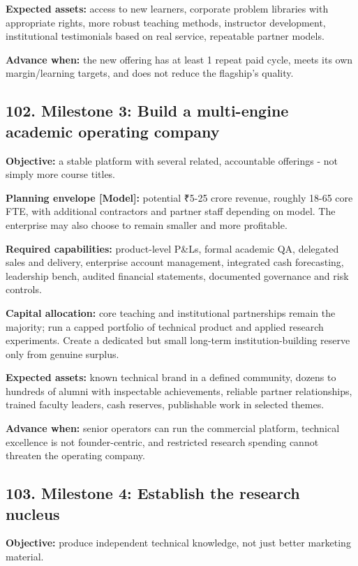 \textbf{Expected assets:} access to new learners, corporate problem libraries with appropriate rights, more robust teaching methods, instructor development, institutional testimonials based on real service, repeatable partner models.

\textbf{Advance when:} the new offering has at least 1 repeat paid cycle, meets its own margin/\allowbreak learning targets, and does not reduce the flagship's quality.

\subsection{102. Milestone 3: Build a multi-engine academic operating company}

\textbf{Objective:} a stable platform with several related, accountable offerings - not simply more course titles.

\textbf{Planning envelope \textbf{[Model]}:} potential \textnormal{₹}5-25 crore revenue, roughly 18-65 core FTE, with additional contractors and partner staff depending on model. The enterprise may also choose to remain smaller and more profitable.

\textbf{Required capabilities:} product-level P\&Ls, formal academic QA, delegated sales and delivery, enterprise account management, integrated cash forecasting, leadership bench, audited financial statements, documented governance and risk controls.

\textbf{Capital allocation:} core teaching and institutional partnerships remain the majority; run a capped portfolio of technical product and applied research experiments. Create a dedicated but small long-term institution-building reserve only from genuine surplus.

\textbf{Expected assets:} known technical brand in a defined community, dozens to hundreds of alumni with inspectable achievements, reliable partner relationships, trained faculty leaders, cash reserves, publishable work in selected themes.

\textbf{Advance when:} senior operators can run the commercial platform, technical excellence is not founder-centric, and restricted research spending cannot threaten the operating company.

\subsection{103. Milestone 4: Establish the research nucleus}

\textbf{Objective:} produce independent technical knowledge, not just better marketing material.

